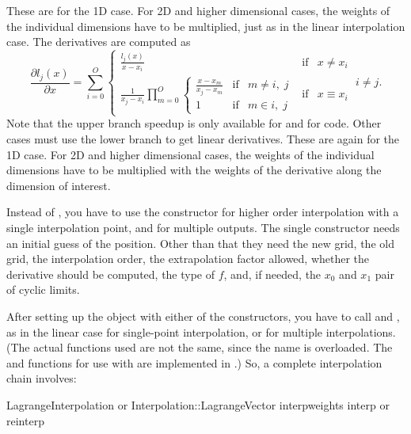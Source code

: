 These are for the 1D case. For 2D and higher dimensional cases, the weights of
the individual dimensions have to be multiplied, just as in the linear
interpolation case.
The derivatives are computed as
\begin{equation}
 \frac{\partial l_j(x)}{\partial x} = \sum_{i=0}^{O}
 \left\{
 \begin{array}{lcr}
  \frac{l_j(x)}{x - x_i} & \mathrm{if} & x \neq x_i \\
  \frac{1}{x_j - x_i} \prod_{m=0}^O
  \left\{
  \begin{array}{lcr}
   \frac{x - x_m}{x_j - x_m} & \mathrm{if} & m \neq i,\; j \\
   1 & \mathrm{if} & m \in i,\; j
  \end{array} \right. & \mathrm{if} & x \equiv x_i
 \end{array}
 \right. \; i \neq j.
\end{equation}
Note that the upper branch speedup is only available for 
 and for  code.
Other cases must use the lower branch to get linear derivatives.
These are again for the 1D case. For 2D and higher dimensional cases, the weights of
the individual dimensions have to be multiplied with the weights of the derivative
along the dimension of interest.

Instead of , you have to use the constructor
 for higher order interpolation
with a single interpolation point, and 
for multiple outputs. The single constructor needs an
initial guess of the position.  Other than that they need the new grid,
the old grid, the interpolation order, the extrapolation factor allowed,
whether the derivative should be computed, the type of $f$, and, if needed,
the $x_0$ and $x_1$ pair of cyclic limits.

After setting up the  object with
either of the constructors, you have to call 
and , as in the linear case for single-point interpolation,
or  for multiple interpolations. (The actual
functions used are not the same, since the name is overloaded. The
 and  functions for use
with  are implemented in
.) So, a complete interpolation chain
involves:

\begin{code}
LagrangeInterpolation or Interpolation::LagrangeVector
interpweights
interp or reinterp
\end{code}

